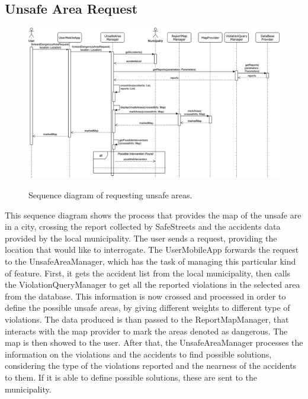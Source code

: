 \documentclass[../RASD.tex]{subfiles}
\begin{document}
    \subsection{Unsafe Area Request}\label{subsec:unsafe-area-request}
    \begin{figure}[H]
        \centering
        \includegraphics[scale = 2]{assets/sequence_diagrams/unsafeAreaRequest.png}\\
        \caption[\textit{Sequence} Diagram (\textit{Show unsafe areas})]{Sequence diagram of requesting unsafe areas.}
    \end{figure}
    This sequence diagram shows the process that provides the map of the unsafe are in a city,
    crossing the report collected by SafeStreets and the accidents data provided by the local municipality.
    The user sends a request, providing the location that would like to interrogate.
    The UserMobileApp forwards the request to the UnsafeAreaManager,  which has the task of managing this particular kind of feature.
    First, it gets the accident list from the local municipality, then calls the ViolationQueryManager to get all the reported violations
    in the selected area from the database.
    This information is now crossed and processed in order to define the possible unsafe areas, by giving different weights to different type of violations.
    The data produced is than passed to the ReportMapManager, that interacts with the map provider to mark the areas denoted as dangerous.
    The map is then showed to the user.
    After that, the UnsafeAreaManager processes the information on the violations and the accidents to find possible solutions,
    considering the type of the violations reported and the nearness of the accidents to them.
    If it is able to define possible solutions, these are sent to the municipality.
\end{document}

